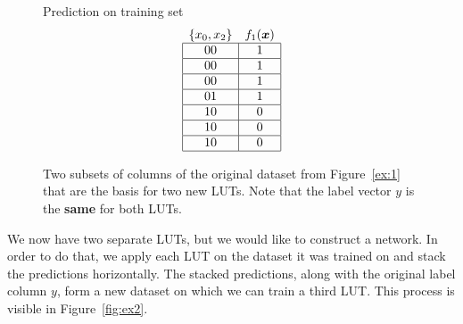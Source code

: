 \begin{figure}[!htb]
\begin{minipage}{.95\linewidth}
\begin{minipage}[b]{.21\linewidth}
      \vspace{1em}
    Prediction on training set
    \vspace{-0.5em}
    \begin{align*}
      \begin{array}{cc}
        \{x_0,x_2\}                    & f_1(\bm{x})              \\ \hline
        \multicolumn{1}{|c|}{00} & \multicolumn{1}{c|}{1} \\ \hline
        \multicolumn{1}{|c|}{00} & \multicolumn{1}{c|}{1} \\ \hline
        \multicolumn{1}{|c|}{00} & \multicolumn{1}{c|}{1} \\ \hline
        \multicolumn{1}{|c|}{01} & \multicolumn{1}{c|}{1} \\ \hline
        \multicolumn{1}{|c|}{10} & \multicolumn{1}{c|}{0} \\ \hline
        \multicolumn{1}{|c|}{10} & \multicolumn{1}{c|}{0} \\ \hline
        \multicolumn{1}{|c|}{10} & \multicolumn{1}{c|}{0} \\ \hline
      \end{array}
    \end{align*}
  \end{minipage}
\end{minipage}
  \normalfont
  \caption{Two subsets of columns of the original dataset from Figure~\ref{ex:1} that are the basis for two new LUTs. Note that the label vector $y$ is the \textbf{same} for both LUTs.}
    \label{fig:ex1}
\end{figure}
\FloatBarrier

\noindent We now have two separate LUTs, but we would like to construct a network. In order to do that, we apply each LUT on the dataset it was trained on and stack the predictions horizontally. The stacked predictions, along with the original label column $y$, form a new dataset on which we can train a third LUT. This process is visible in Figure~\ref{fig:ex2}.

